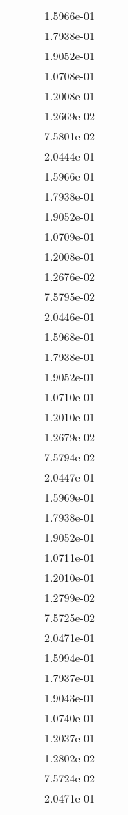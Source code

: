 \begin{xltabular}{\textwidth}{r|rS[table-format=1.3e+2]S[table-format=1.4e+2]S[table-format=1.4e+2]S[table-format=-1.5]}
&  &  & 1.5966e-01 & & \\
&  &  & 1.7938e-01 & & \\
&  &  & 1.9052e-01 & & \\
&  &  & 1.0708e-01 & & \\
&  &  & 1.2008e-01 & & \\
&  &  & 1.2669e-02 & & \\
&  &  & 7.5801e-02 & & \\
&  &  & 2.0444e-01 & & \\
&  &  & 1.5966e-01 & & \\
&  &  & 1.7938e-01 & & \\
&  &  & 1.9052e-01 & & \\
&  &  & 1.0709e-01 & & \\
&  &  & 1.2008e-01 & & \\
&  &  & 1.2676e-02 & & \\
&  &  & 7.5795e-02 & & \\
&  &  & 2.0446e-01 & & \\
&  &  & 1.5968e-01 & & \\
&  &  & 1.7938e-01 & & \\
&  &  & 1.9052e-01 & & \\
&  &  & 1.0710e-01 & & \\
&  &  & 1.2010e-01 & & \\
&  &  & 1.2679e-02 & & \\
&  &  & 7.5794e-02 & & \\
&  &  & 2.0447e-01 & & \\
&  &  & 1.5969e-01 & & \\
&  &  & 1.7938e-01 & & \\
&  &  & 1.9052e-01 & & \\
&  &  & 1.0711e-01 & & \\
&  &  & 1.2010e-01 & & \\
&  &  & 1.2799e-02 & & \\
&  &  & 7.5725e-02 & & \\
&  &  & 2.0471e-01 & & \\
&  &  & 1.5994e-01 & & \\
&  &  & 1.7937e-01 & & \\
&  &  & 1.9043e-01 & & \\
&  &  & 1.0740e-01 & & \\
&  &  & 1.2037e-01 & & \\
&  &  & 1.2802e-02 & & \\
&  &  & 7.5724e-02 & & \\
&  &  & 2.0471e-01 & & \\

\end{xltabular}
